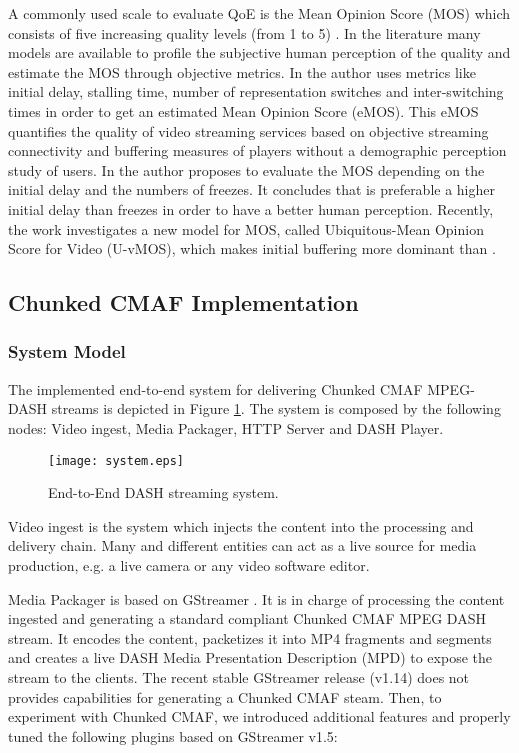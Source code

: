 A commonly used scale to evaluate QoE is the Mean Opinion Score (MOS) which consists of five increasing quality levels (from 1 to 5) \cite{Itu2016}. In the literature many models are available to profile the subjective human perception of the quality and estimate the MOS through objective metrics. In \cite{claeys2014} the author uses metrics like initial delay, stalling time, number of representation switches and inter-switching times in order to get an estimated Mean Opinion Score (eMOS). This eMOS quantifies the quality of video streaming services based on objective streaming connectivity and buffering measures of players without a demographic perception study of users. In \cite{hossfeld2012} the author proposes to evaluate the MOS depending on the initial delay and the numbers of freezes. It concludes that is preferable a higher initial delay than freezes in order to have a better human perception. Recently, the work \cite{lentisco2017} investigates a new model for MOS, called Ubiquitous-Mean Opinion Score for Video (U-vMOS), which makes initial buffering more dominant than \cite{claeys2014}.

\subsection{Chunked CMAF Implementation}
\label{sec:BMSB2019implementation}

\subsubsection{System Model}
\label{sec:BMSB2019system}

The implemented end-to-end system for delivering Chunked CMAF MPEG-DASH streams is depicted in Figure \ref{fig:BMSB2019system}. The system is composed by the following nodes: Video ingest, Media Packager, HTTP Server and DASH Player.

\begin{figure}[htp]
	\centering
	\texttt{[image: system.eps]}
	\caption{End-to-End DASH streaming system.}
	\label{fig:BMSB2019system}
\end{figure}

Video ingest is the system which injects the content into the processing and delivery chain. Many and different entities can act as a live source for media production, e.g. a live camera or any video software editor.

Media Packager is based on GStreamer \cite{gstreamer}. It is in charge of processing the content ingested and generating a standard compliant Chunked CMAF MPEG DASH stream. It encodes the content, packetizes it into MP4 fragments and segments and creates a live DASH Media Presentation Description (MPD) to expose the stream to the clients. The recent stable GStreamer release (v1.14) does not provides capabilities for generating a Chunked CMAF steam. Then, to experiment with Chunked CMAF, we introduced additional features and properly tuned the following plugins based on GStreamer v1.5:


